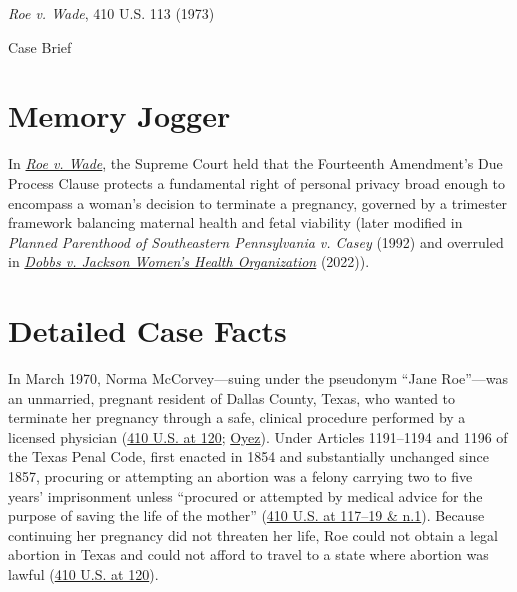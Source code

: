 \documentclass[12pt]{article}
\begin{document}
\begin{center}
{\LARGE \textit{Roe v. Wade}, 410 U.S. 113 (1973)\par}
\vspace{0.8em}
{\large Case Brief\par}
\end{center}
\vspace{1em}

\section{Memory Jogger}

In \href{https://www.courtlistener.com/opinion/108713/roe-v-wade/}{\textit{Roe v. Wade}}, the Supreme Court held that the Fourteenth Amendment's Due Process Clause protects a fundamental right of personal privacy broad enough to encompass a woman's decision to terminate a pregnancy, governed by a trimester framework balancing maternal health and fetal viability (later modified in \textit{Planned Parenthood of Southeastern Pennsylvania v. Casey} (1992) and overruled in \href{https://www.supremecourt.gov/opinions/21pdf/19-1392_6j37.pdf}{\textit{Dobbs v. Jackson Women's Health Organization}} (2022)).

\section{Detailed Case Facts}

In March 1970, Norma McCorvey---suing under the pseudonym ``Jane Roe''---was an unmarried, pregnant resident of Dallas County, Texas, who wanted to terminate her pregnancy through a safe, clinical procedure performed by a licensed physician (\href{https://supreme.justia.com/cases/federal/us/410/113/}{410 U.S. at 120}; \href{https://www.oyez.org/cases/1971/70-18}{Oyez}). Under Articles 1191--1194 and 1196 of the Texas Penal Code, first enacted in 1854 and substantially unchanged since 1857, procuring or attempting an abortion was a felony carrying two to five years' imprisonment unless ``procured or attempted by medical advice for the purpose of saving the life of the mother'' (\href{https://supreme.justia.com/cases/federal/us/410/113/}{410 U.S. at 117--19 \& n.1}). Because continuing her pregnancy did not threaten her life, Roe could not obtain a legal abortion in Texas and could not afford to travel to a state where abortion was lawful (\href{https://supreme.justia.com/cases/federal/us/410/113/}{410 U.S. at 120}).
\end{document}
